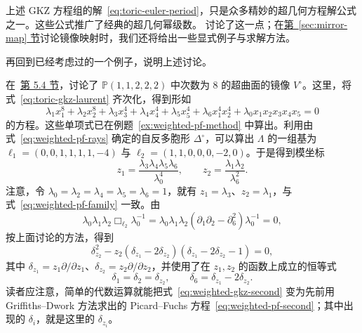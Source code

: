 上述 GKZ 方程组的解~\eqref{eq:toric-euler-period}，只是众多精妙的超几何方程解公式之一。这些公式推广了经典的超几何幂级数。 讨论了这一点；在\hyperref[sec:mirror-map]{第~\ref*{sec:mirror-map} 节}讨论镜像映射时，我们还将给出一些显式例子与求解方法。

再回到已经考虑过的一个例子，说明上述讨论。
\begin{example}\label{ex:weighted-gkz}
在~\hyperref[sec:hodge-examples]{第 5.4 节}，讨论了 $\mathbb P(1,1,2,2,2)$ 中次数为 $8$ 的超曲面的镜像 $V^\circ$。这里，将式~\eqref{eq:toric-gkz-laurent} 齐次化，得到形如
\[
\lambda_1x_1^8+\lambda_2x_2^8+\lambda_3x_3^4+\lambda_4x_4^4+\lambda_5x_5^4
+\lambda_6x_1^4x_2^4+\lambda_0x_1x_2x_3x_4x_5=0
\]
的方程。这些单项式已在例题~\ref{ex:weighted-pf-method} 中算出。利用由式~\eqref{eq:weighted-pf-rays} 确定的自反多胞形 $\Delta^\circ$，可以算出 $\Lambda$ 的一组基为
$\ell_1=(0,0,1,1,1,1,-4)$ 与 $\ell_2=(1,1,0,0,0,-2,0)$。于是得到模坐标
\[
z_1=\frac{\lambda_3\lambda_4\lambda_5\lambda_6}{\lambda_0^4},\qquad
z_2=\frac{\lambda_1\lambda_2}{\lambda_6^2}.
\]
注意，令 $\lambda_0=\lambda_2=\lambda_4=\lambda_5=\lambda_6=1$，就有 $z_1=\lambda_3$、$z_2=\lambda_1$，与式~\eqref{eq:weighted-pf-family} 一致。由
\[
\lambda_0\lambda_1\lambda_2\Box_{\ell_2}\lambda_0^{-1}
=\lambda_0\lambda_1\lambda_2(\partial_1\partial_2-\partial_6^2)\lambda_0^{-1}=0,
\]
按上面讨论的方法，得到
\begin{equation}\label{eq:weighted-gkz-second}
\delta_{z_2}^2-z_2(\delta_{z_1}-2\delta_{z_2})(\delta_{z_1}-2\delta_{z_2}-1)=0,
\end{equation}
其中 $\delta_{z_1}=z_1\partial/\partial z_1$、$\delta_{z_2}=z_2\partial/\partial z_2$，并使用了在 $z_1,z_2$ 的函数上成立的恒等式
\begin{equation}\label{eq:weighted-logarithmic-identities}
\delta_1=\delta_2=\delta_{z_2},\qquad\delta_6=\delta_{z_1}-2\delta_{z_2}.
\end{equation}
读者应注意，简单的代数运算就能把式~\eqref{eq:weighted-gkz-second} 变为先前用 Griffiths--Dwork 方法求出的 Picard--Fuchs 方程~\eqref{eq:weighted-pf-second}；其中出现的 $\delta_i$，就是这里的 $\delta_{z_i}$。


\end{example}
